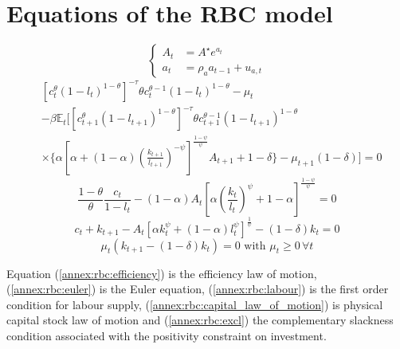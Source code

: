 \documentclass[a4paper,11pt]{amsart}
\begin{document}
\newpage

\setcounter{equation}{0}
\renewcommand{\theequation}{\thesection.\arabic{equation}}


\section{Equations of the RBC model}\label{appendix:rbc}
\setcounter{equation}{0}

\begin{equation}
   \label{annex:rbc:efficiency}
   \begin{cases}
      A_t & = A^{\star}e^{a_t}         \\
      a_t & = \rho_a a_{t-1} + u_{a,t}
   \end{cases}
\end{equation}
\begin{equation}
   \label{annex:rbc:euler}
   \begin{split}
       & \left[c_t^{\theta}(1-l_t)^{1-\theta}\right]^{-\tau}\theta c_t^{\theta-1}(1-l_t)^{1-\theta}-\mu_t                                                                              \\ &-
      \beta \mathbb E_t \Biggl[\left[c_{t+1}^{\theta}(1-l_{t+1})^{1-\theta}\right]^{-\tau}\theta c_{t+1}^{\theta-1}(1-l_{t+1})^{1-\theta}                                              \\
       & \times \Biggl\{\alpha \left[\alpha+(1-\alpha)\left(\frac{k_{t+1}}{l_{t+1}}\right)^{-\psi}\right]^{\frac{1-\psi}{\psi}}A_{t+1}+1-\delta\Biggr\}-\mu_{t+1}(1-\delta)\Biggr] = 0
   \end{split}
\end{equation}
\begin{equation}
   \label{annex:rbc:labour}
   \frac{1-\theta}{ \theta}\frac{c_t}{1-l_t} - (1-\alpha)A_t\left[\alpha \left(\frac{k_t}{l_t}\right)^{\psi}+1-\alpha\right]^{\frac{1-\psi}{\psi}} = 0
\end{equation}
\begin{equation}
   \label{annex:rbc:capital_law_of_motion}
   c_t + k_{t+1} - A_t\left[\alpha k_t^{\psi} + (1-\alpha) l_t^{\psi}\right]^{\frac{1}{\psi}}- (1-\delta)k_t = 0
\end{equation}
\begin{equation}
   \label{annex:rbc:excl}
   \mu_t \left(k_{t+1}-(1-\delta)k_t\right) = 0\text{ with }\mu_t\geq 0 \, \forall t
\end{equation}
\newline

Equation (\ref{annex:rbc:efficiency}) is the efficiency law of
motion, (\ref{annex:rbc:euler}) is the Euler equation,
(\ref{annex:rbc:labour}) is the first order condition for labour
supply, (\ref{annex:rbc:capital_law_of_motion}) is physical capital
stock law of motion and (\ref{annex:rbc:excl}) the complementary slackness condition
associated with the positivity constraint on investment.\newline
\end{document}
